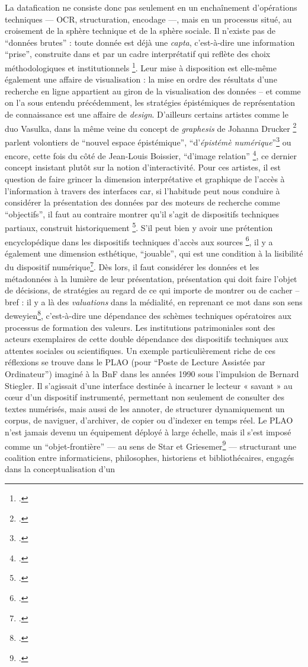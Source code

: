 La datafication ne consiste donc pas seulement en un enchaînement d’opérations techniques — OCR, structuration, encodage —, mais en un processus situé, au croisement de la sphère technique et de la sphère sociale. Il n’existe pas de \enquote{données brutes} : toute donnée est déjà une \emph{capta}, c’est-à-dire une information \enquote{prise}, construite dans et par un cadre interprétatif qui reflète des choix méthodologiques et institutionnels \footcite[][]{drucker}. Leur mise à disposition est elle-même également une affaire de visualisation : la mise en ordre des résultats d'une recherche en ligne appartient au giron de la visualisation des données -- et comme on l'a sous entendu précédemment, les stratégies épistémiques de représentation de connaissance est une affaire de \emph{design}. D'ailleurs certains artistes comme le duo Vasulka, dans la même veine du concept de \emph{graphesis} de Johanna Drucker \footcite[][]{drucker} parlent volontiers de \enquote{nouvel espace épistémique}, \enquote{d'\emph{épistémè numérique}}\footcite[][]{dallet} ou encore, cette fois du côté de Jean-Louis Boissier, \enquote{d'image relation} \footcite[][]{boissier}, ce dernier concept insistant plutôt sur la notion d'interactivité. Pour ces artistes, il est question de faire grincer la dimension interprétative et graphique de l'accès à l'information à travers des interfaces car, si l'habitude peut nous conduire à considérer la présentation des données par des moteurs de recherche comme \enquote{objectifs}, il faut au contraire montrer qu'il s'agit de dispositifs techniques partiaux, construit historiquement \footcite[][]{daston}. S'il peut bien y avoir une prétention encyclopédique dans les dispositifs techniques d'accès aux sources \footcite[][]{wagneur}, il y a également une dimension esthétique, \enquote{jouable}, qui est une condition à la lisibilité du dispositif numérique\footcite[][]{boissier}. Dès lors, il faut considérer les données et les métadonnées à la lumière de leur présentation, présentation qui doit faire l'objet de décisions, de stratégies au regard de ce qui importe de montrer ou de cacher -- bref : il y a là des \emph{valuations} dans la médialité, en reprenant ce mot dans son sens deweyien\footcite[][]{dewey}, c'est-à-dire une dépendance des schèmes techniques opératoires aux processus de formation des valeurs. Les institutions patrimoniales sont des acteurs exemplaires de cette double dépendance des dispositifs techniques aux attentes sociales ou scientifiques. Un exemple particulièrement riche de ces réflexions se trouve dans le PLAO (pour \enquote{Poste de Lecture Assistée par Ordinateur}) imaginé à la BnF dans les années 1990 sous l’impulsion de Bernard Stiegler. Il s’agissait d’une interface destinée à incarner le lecteur « savant » au cœur d’un dispositif instrumenté, permettant non seulement de consulter des textes numérisés, mais aussi de les annoter, de structurer dynamiquement un corpus, de naviguer, d’archiver, de copier ou d’indexer en temps réel. Le PLAO n’est jamais devenu un équipement déployé à large échelle, mais il s’est imposé comme un \enquote{objet-frontière} — au sens de Star et Griesemer\footcite[][]{trompette} — structurant une coalition entre informaticiens, philosophes, historiens et bibliothécaires, engagés dans la conceptualisation d’un 